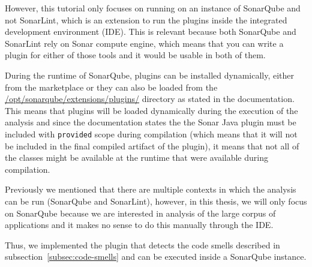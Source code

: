 However, this tutorial only focuses on running on an instance of SonarQube and not SonarLint, which is an
extension to run the plugins inside the integrated development environment (IDE).
This is relevant because both SonarQube and SonarLint rely on Sonar compute engine, which means that you can write
a plugin for either of those tools and it would be usable in both of them.

During the runtime of SonarQube, plugins can be installed dynamically, either from the marketplace or they can
also be loaded from the \url{/opt/sonarqube/extensions/plugins/} directory as stated in the documentation.
This means that plugins will be loaded dynamically during the execution of the analysis and since the documentation
states the the Sonar Java plugin must be included with \verb|provided| scope during compilation (which means that it
will not be included in the final compiled artifact of the plugin), it means that not all of the classes might be
available at the runtime that were available during compilation.


Previously we mentioned that there are multiple contexts in which the analysis can be run (SonarQube and SonarLint),
however, in this thesis, we will only focus on SonarQube because we are interested in analysis of the large corpus
of applications and it makes no sense to do this manually through the IDE\@.

Thus, we implemented the plugin that detects the code smells described in subsection~\ref{subsec:code-smells} and
can be executed inside a SonarQube instance.

